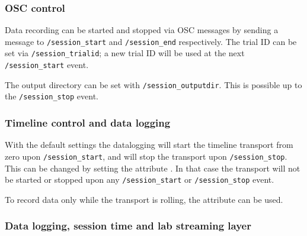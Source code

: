 \subsubsection*{OSC control}

Data recording can be started and stopped via OSC messages by sending a
message to \verb!/session_start! and \verb!/session_end!
respectively. The trial ID can be set via \verb!/session_trialid!; a new
trial ID will be used at the next \verb!/session_start! event.

The output directory can be set with \verb!/session_outputdir!. This is
possible up to the \verb!/session_stop! event.




\subsubsection*{Timeline control and data logging}

With the default settings the datalogging will start the timeline
transport from zero upon \verb!/session_start!, and will stop the
transport upon \verb!/session_stop!. This can be changed by setting the
attribute . In that case the transport
will not be started or stopped upon any \verb!/session_start!
or \verb!/session_stop! event.

To record data only while the transport is rolling, the
attribute  can be used.

\subsubsection*{Data logging, session time and lab streaming layer}

